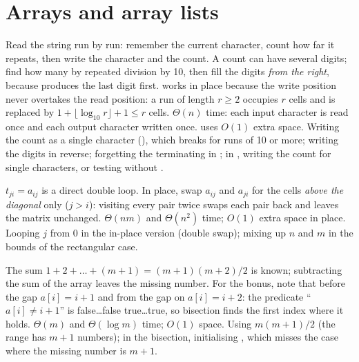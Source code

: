 \section{Arrays and array lists}

\idea Read the string run by run: remember the current character, count how far it
repeats, then write the character and the count. A count can have several digits; find
how many by repeated division by 10, then fill the digits \emph{from the right}, because
 produces the last digit first.  works in place because the
write position never overtakes the read position: a run of length $r\ge2$ occupies $r$
cells and is replaced by $1+\lfloor\log_{10}r\rfloor+1\le r$ cells.
\complexity $\Theta(n)$ time: each input character is read once and each output character
written once.  uses $O(1)$ extra space.
\mistakes Writing the count as a single character (), which breaks for runs of
10 or more; writing the digits in reverse; forgetting the terminating  in ; in , writing the count  for single
characters, or testing  without .

\idea $t_{ji}=a_{ij}$ is a direct double loop. In place, swap $a_{ij}$ and $a_{ji}$ for
the cells \emph{above the diagonal} only ($j>i$): visiting every pair twice swaps each
pair back and leaves the matrix unchanged.
\complexity $\Theta(nm)$ and $\Theta(n^2)$ time; $O(1)$ extra space in place.
\mistakes Looping $j$ from 0 in the in-place version (double swap); mixing up $n$ and $m$
in the bounds of the rectangular case.

\idea The sum $1+2+\dots+(m+1)=(m+1)(m+2)/2$ is known; subtracting the sum of the array
leaves the missing number. For the bonus, note that before the gap $a[i]=i+1$ and from the
gap on $a[i]=i+2$: the predicate ``$a[i]\ne i+1$'' is false\ldots false true\ldots true, so
bisection finds the first index where it holds.
\complexity $\Theta(m)$ and $\Theta(\log m)$ time; $O(1)$ space.
\mistakes Using $m(m+1)/2$ (the range has $m+1$ numbers); in the bisection, initialising
, which misses the case where the missing number is $m+1$.

